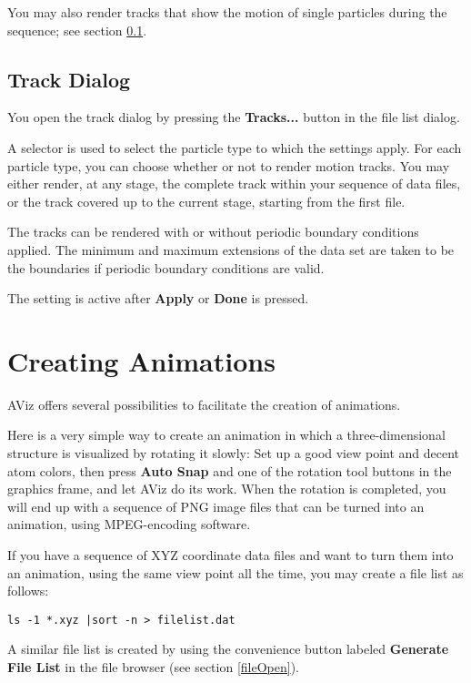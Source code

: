 \documentclass[11pt]{article}
\begin{document}
You may also render tracks that show the motion of single particles during
the sequence; see section \ref{trackDialog}.

\subsection{Track Dialog}
\label{trackDialog}
You open the track dialog by pressing the {\bf Tracks...} button in the 
file list dialog. 

A selector is used to select the particle type to which the settings apply.
For each particle type, you can choose whether or not to render motion
tracks.  You may either render, at any stage, the complete track within
your sequence of data files, or the track covered up to the current
stage, starting from the first file.  

The tracks can be rendered with or without periodic boundary conditions
applied.  The minimum and maximum extensions of the data set are taken to be
the boundaries if periodic boundary conditions are valid.

The setting is active after {\bf Apply} or {\bf Done} is pressed.

\section{Creating Animations}

AViz offers several possibilities to facilitate the 
creation of animations.  

Here is a very simple way to create an animation in which a three-dimensional
structure is visualized by rotating it slowly: Set up a good view point and
decent atom colors, then press {\bf Auto Snap} and one of the rotation tool
buttons in the graphics frame, and let AViz do its work.  When the rotation is
completed, you will end up with a sequence of PNG image files that can be
turned into an animation, using MPEG-encoding software. 

If you have a sequence of XYZ coordinate data files and want to turn 
them into an animation, using the same view point all the time, you 
may create a file list as follows:

\begin{verbatim}
ls -1 *.xyz |sort -n > filelist.dat
\end{verbatim}

A similar file list is created by using the convenience button labeled {\bf
Generate File List} in the file browser (see section \ref{fileOpen}).
\end{document}
